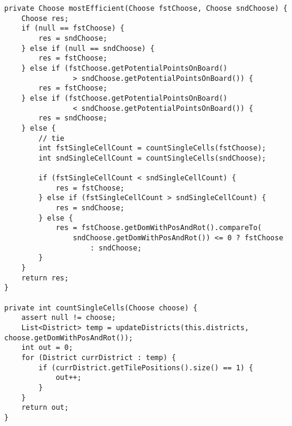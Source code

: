 \begin{lstlisting}[float,style=CodeHighlighting,caption=DefaultAIPlayer - mostEfficient,label=lst:defaultAIPlayer_mostEfficient]
private Choose mostEfficient(Choose fstChoose, Choose sndChoose) {
    Choose res;
    if (null == fstChoose) {
        res = sndChoose;
    } else if (null == sndChoose) {
        res = fstChoose;
    } else if (fstChoose.getPotentialPointsOnBoard() 
    			> sndChoose.getPotentialPointsOnBoard()) {
        res = fstChoose;
    } else if (fstChoose.getPotentialPointsOnBoard() 
    			< sndChoose.getPotentialPointsOnBoard()) {
        res = sndChoose;
    } else {
        // tie
        int fstSingleCellCount = countSingleCells(fstChoose);
        int sndSingleCellCount = countSingleCells(sndChoose);

        if (fstSingleCellCount < sndSingleCellCount) {
            res = fstChoose;
        } else if (fstSingleCellCount > sndSingleCellCount) {
            res = sndChoose;
        } else {
            res = fstChoose.getDomWithPosAndRot().compareTo(
            	sndChoose.getDomWithPosAndRot()) <= 0 ? fstChoose
                    : sndChoose;
        }
    }
    return res;
}

private int countSingleCells(Choose choose) {
    assert null != choose;
    List<District> temp = updateDistricts(this.districts, choose.getDomWithPosAndRot());
    int out = 0;
    for (District currDistrict : temp) {
        if (currDistrict.getTilePositions().size() == 1) {
            out++;
        }
    }
    return out;
}
\end{lstlisting}